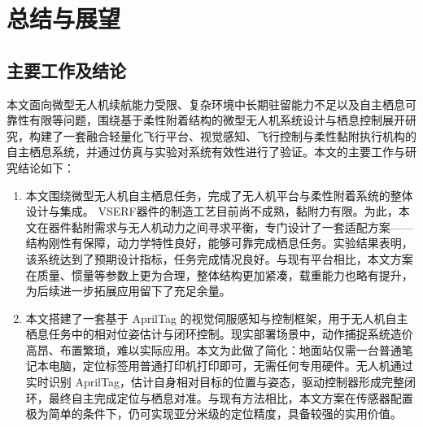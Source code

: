 \chapter{总结与展望}

\section{主要工作及结论}

本文面向微型无人机续航能力受限、复杂环境中长期驻留能力不足以及自主栖息可靠性有限等问题，围绕基于柔性附着结构的微型无人机系统设计与栖息控制展开研究，构建了一套融合轻量化飞行平台、视觉感知、飞行控制与柔性黏附执行机构的自主栖息系统，并通过仿真与实验对系统有效性进行了验证。本文的主要工作与研究结论如下：

\begin{enumerate}

\item 本文围绕微型无人机自主栖息任务，完成了无人机平台与柔性附着系统的整体设计与集成。
VSERF器件的制造工艺目前尚不成熟，黏附力有限。为此，本文在器件黏附需求与无人机动力之间寻求平衡，专门设计了一套适配方案——结构刚性有保障，动力学特性良好，能够可靠完成栖息任务。实验结果表明，该系统达到了预期设计指标，任务完成情况良好。与现有平台相比，本文方案在质量、惯量等参数上更为合理，整体结构更加紧凑，载重能力也略有提升，为后续进一步拓展应用留下了充足余量。


\item 本文搭建了一套基于 AprilTag 的视觉伺服感知与控制框架，用于无人机自主栖息任务中的相对位姿估计与闭环控制。现实部署场景中，动作捕捉系统造价高昂、布置繁琐，难以实际应用。本文为此做了简化：地面站仅需一台普通笔记本电脑，定位标签用普通打印机打印即可，无需任何专用硬件。无人机通过实时识别 AprilTag，估计自身相对目标的位置与姿态，驱动控制器形成完整闭环，最终自主完成定位与栖息对准。与现有方法相比，本文方案在传感器配置极为简单的条件下，仍可实现亚分米级的定位精度，具备较强的实用价值。


\end{enumerate}
